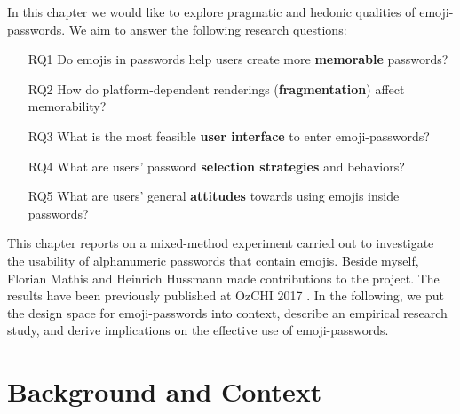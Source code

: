 In this chapter we would like to explore pragmatic and hedonic qualities of emoji-passwords. We aim to answer the following research questions:
\begin{itemize}
	\item[RQ1] Do emojis in passwords help users create more \textbf{memorable} passwords?
	\item[RQ2] How do platform-dependent renderings (\textbf{fragmentation}) affect memorability?
	\item[RQ3] What is the most feasible \textbf{user interface} to enter emoji-passwords?
	\item[RQ4] What are users' password \textbf{selection strategies} and behaviors?
	\item[RQ5] What are users' general \textbf{attitudes} towards using emojis inside passwords?
\end{itemize}

This chapter reports on a mixed-method experiment carried out to investigate the usability of alphanumeric passwords that contain emojis. Beside myself, Florian Mathis and Heinrich Hussmann made contributions to the project. The results have been previously published at OzCHI 2017 \cite{Seitz2017Emojipasswords}. In the following, we put the design space for emoji-passwords into context, describe an empirical research study, and derive implications on the effective use of emoji-passwords.

\section{Background and Context}

